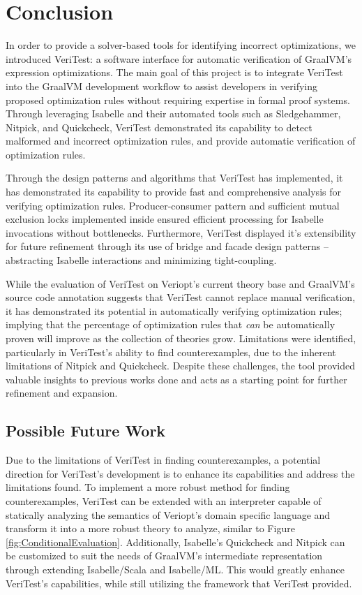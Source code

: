 \chapter{Conclusion \label{sec:conclusion}}

In order to provide a solver-based tools for identifying incorrect optimizations, we introduced VeriTest: a software interface 
for automatic verification of GraalVM's expression optimizations. The main goal of this project is to integrate VeriTest into 
the GraalVM development workflow to assist developers in verifying proposed optimization rules without requiring expertise in formal 
proof systems. Through leveraging Isabelle and their automated tools such as Sledgehammer, Nitpick, and Quickcheck, VeriTest demonstrated 
its capability to detect malformed and incorrect optimization rules, and provide automatic verification of optimization rules.

Through the design patterns and algorithms that VeriTest has implemented, it has demonstrated its capability to provide fast and comprehensive 
analysis for verifying optimization rules. Producer-consumer pattern and sufficient mutual exclusion locks implemented inside ensured efficient 
processing for Isabelle invocations without bottlenecks. Furthermore, VeriTest displayed it's extensibility for future refinement through its use of 
bridge and facade design patterns -- abstracting Isabelle interactions and minimizing tight-coupling.

While the evaluation of VeriTest on Veriopt's current theory base and GraalVM's source code annotation suggests that VeriTest cannot replace 
manual verification, it has demonstrated its potential in automatically verifying optimization rules; implying that the percentage of 
optimization rules that \emph{can} be automatically proven will improve as the collection of theories grow. Limitations were identified, 
particularly in VeriTest's ability to find counterexamples, due to the inherent limitations of Nitpick and Quickcheck. Despite these challenges, 
the tool provided valuable insights to previous works done and acts as a starting point for further refinement and expansion.

\section{Possible Future Work \label{sec:future_work}}

Due to the limitations of VeriTest in finding counterexamples, a potential direction for VeriTest's development is to enhance 
its capabilities and address the limitations found. To implement a more robust method for finding counterexamples, VeriTest can be 
extended with an interpreter capable of statically analyzing the semantics of Veriopt's domain specific language and transform it into a more 
robust theory to analyze, similar to Figure \ref{fig:ConditionalEvaluation}. Additionally, Isabelle's Quickcheck and Nitpick can be customized 
to suit the needs of GraalVM's intermediate representation through extending Isabelle/Scala and Isabelle/ML. This would greatly enhance 
VeriTest's capabilities, while still utilizing the framework that VeriTest provided.

